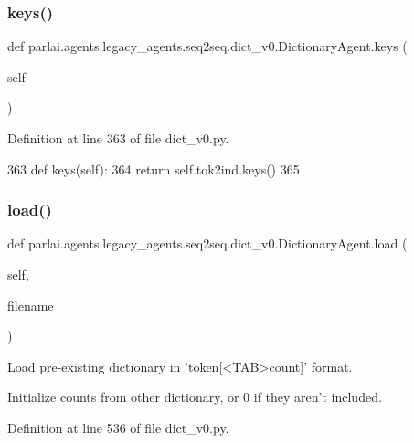 \subsubsection{\texorpdfstring{keys()}{keys()}}
{\footnotesize\ttfamily def parlai.\+agents.\+legacy\+\_\+agents.\+seq2seq.\+dict\+\_\+v0.\+Dictionary\+Agent.\+keys (\begin{DoxyParamCaption}\item[{}]{self }\end{DoxyParamCaption})}



Definition at line 363 of file dict\+\_\+v0.\+py.


\begin{DoxyCode}
363     \textcolor{keyword}{def }keys(self):
364         \textcolor{keywordflow}{return} self.tok2ind.keys()
365 
\end{DoxyCode}
\mbox{\label{classparlai_1_1agents_1_1legacy__agents_1_1seq2seq_1_1dict__v0_1_1DictionaryAgent_a4a13c4937c3cd5bb14d5f28658ece153}} 
\subsubsection{\texorpdfstring{load()}{load()}}
{\footnotesize\ttfamily def parlai.\+agents.\+legacy\+\_\+agents.\+seq2seq.\+dict\+\_\+v0.\+Dictionary\+Agent.\+load (\begin{DoxyParamCaption}\item[{}]{self,  }\item[{}]{filename }\end{DoxyParamCaption})}

\begin{DoxyVerb}Load pre-existing dictionary in 'token[<TAB>count]' format.

Initialize counts from other dictionary, or 0 if they aren't included.
\end{DoxyVerb}
 

Definition at line 536 of file dict\+\_\+v0.\+py.


